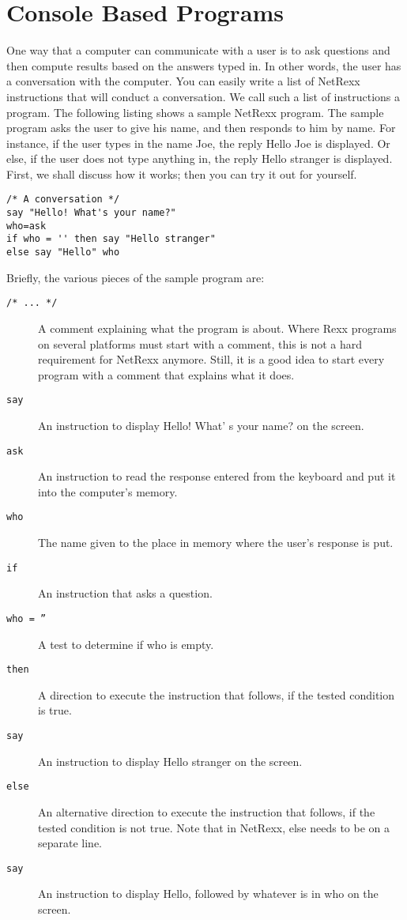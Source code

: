\documentclass[10pt]{book}
\begin{document}
\section{Console Based Programs}
One way that a computer can communicate with a user is to ask
questions and then compute results based on the answers typed in. In
other words, the user has a conversation with the computer. You can
easily write a list of  NetRexx instructions that will conduct a conversation. We call such a list of instructions a program.
The following listing shows a sample NetRexx program. The sample program asks the user to give his name, and then responds to him by name. For instance, if the user types in the name Joe, the reply Hello Joe is displayed. Or else, if the user does not type anything in, the reply Hello stranger is displayed.
First, we shall discuss how it works; then you can try it out for
yourself.
\begin{lstlisting}[label=hello,caption=Hello Stranger]
/* A conversation */
say "Hello! What's your name?"
who=ask
if who = '' then say "Hello stranger"
else say "Hello" who
\end{lstlisting}
Briefly, the various pieces of the sample program are:
\begin{description}
\item[\texttt{/* ... */}] A comment explaining what the program is
  about. Where Rexx programs on several platforms must start with a comment, this is not
  a hard requirement for NetRexx anymore. Still, it is a good idea to start
  every program with a comment that explains what it does.
\item [\texttt{say}] An instruction to display Hello! What' s your name? on the screen.
\item [\texttt{ask}] An instruction to read the response entered from the keyboard and put it into the computer's memory.
\item [\texttt{who}] The name given to the place in memory where the user's response is put.
\item [\texttt{if}] An instruction that asks a question. 
\item [\texttt{who = ''}] A test to determine if who is empty.
\item [\texttt{then}] A direction to execute the instruction that follows, if the tested condition is true.
\item [\texttt{say}] An instruction to display Hello stranger on the screen.
\item [\texttt{else}] An alternative direction to execute the
  instruction that follows, if the tested condition is not true. Note
  that in NetRexx, else needs to be on a separate line.
\item [\texttt{say}] An instruction to display Hello, followed by whatever is in who on the screen.
\end{description}
\end{document}
